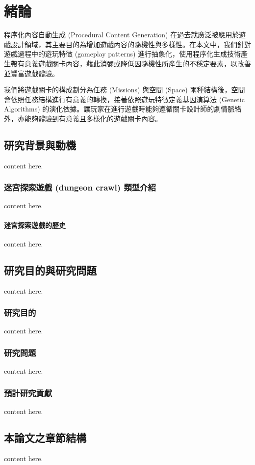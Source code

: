 % 
\chapter{緒論}
\label{cha:intro}

程序化內容自動生成 (Procedural Content Generation) 在過去就廣泛被應用於遊戲設計領域，其主要目的為增加遊戲內容的隨機性與多樣性。在本文中，我們針對遊戲過程中的遊玩特徵 (gameplay patterns) 進行抽象化，使用程序化生成技術產生帶有意義遊戲關卡內容，藉此消彌或降低因隨機性所產生的不穩定要素，以改善並豐富遊戲體驗。

我們將遊戲關卡的構成劃分為任務 (Missions) 與空間 (Space) 兩種結構後，空間會依照任務結構進行有意義的轉換，接著依照遊玩特徵定義基因演算法 (Genetic Algorithms) 的演化依據。讓玩家在進行遊戲時能夠遵循關卡設計師的劇情脈絡外，亦能夠體驗到有意義且多樣化的遊戲關卡內容。

\section{研究背景與動機}

content here.

\subsection{迷宮探索遊戲 (dungeon crawl) 類型介紹}

content here.

\subsubsection{迷宮探索遊戲的歷史}

content here.


\section{研究目的與研究問題}

content here.

\subsection{研究目的}

content here.

\subsection{研究問題}

content here.

\subsection{預計研究貢獻}

content here.


\section{本論文之章節結構}

content here.

